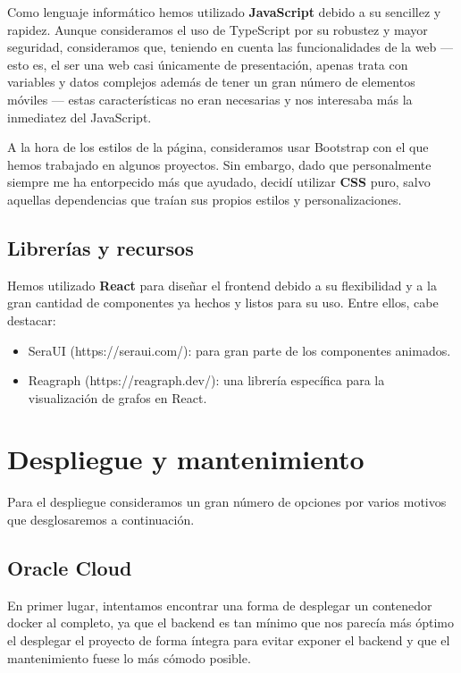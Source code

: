 Como lenguaje informático hemos utilizado \textbf{JavaScript} debido a su sencillez y rapidez. Aunque consideramos el uso de TypeScript por su robustez y mayor seguridad, consideramos que, teniendo en cuenta las funcionalidades de la web — esto es, el ser una web casi únicamente de presentación, apenas trata con variables y datos complejos además de tener un gran número de elementos móviles — estas características no eran necesarias y nos interesaba más la inmediatez del JavaScript. 

A la hora de los estilos de la página, consideramos usar Bootstrap con el que hemos trabajado en algunos proyectos. Sin embargo, dado que personalmente siempre me ha entorpecido más que ayudado, decidí utilizar \textbf{CSS} puro, salvo aquellas dependencias que traían sus propios estilos y personalizaciones.

\subsection{Librerías y recursos}

Hemos utilizado \textbf{React} para diseñar el frontend debido a su flexibilidad y a la gran cantidad de componentes ya hechos y listos para su uso. Entre ellos, cabe destacar:

\begin{itemize}
    \item SeraUI (https://seraui.com/): para gran parte de los componentes animados.
    \item Reagraph (https://reagraph.dev/): una librería específica para la visualización de grafos en React.
\end{itemize}


\section{Despliegue y mantenimiento}

Para el despliegue consideramos un gran número de opciones por varios motivos que desglosaremos a continuación.

\subsection{Oracle Cloud}

En primer lugar, intentamos encontrar una forma de desplegar un contenedor docker al completo, ya que el backend es tan mínimo que nos parecía más óptimo el desplegar el proyecto de forma íntegra para evitar exponer el backend y que el mantenimiento fuese lo más cómodo posible.

